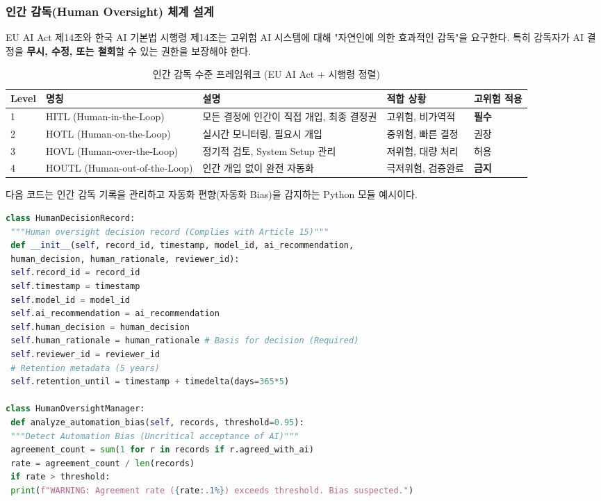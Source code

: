 \subsubsection*{인간 감독(Human Oversight) 체계 설계}
EU AI Act 제14조와 한국 AI 기본법 시행령 제14조는 고위험 AI 시스템에 대해 "자연인에 의한 효과적인 감독"을 요구한다. 특히 감독자가 AI 결정을 \textbf{무시, 수정, 또는 철회}할 수 있는 권한을 보장해야 한다.

\begin{table}[h]
\centering
\caption{인간 감독 수준 프레임워크 (EU AI Act + 시행령 정렬)}
\begin{tabular}{|p{}|p{}|p{}|p{}|p{}|}
\hline
\textbf{Level} & \textbf{명칭} & \textbf{설명} & \textbf{적합 상황} & \textbf{고위험 적용} \\ \hline
1 & HITL (Human-in-the-Loop) & 모든 결정에 인간이 직접 개입, 최종 결정권 & 고위험, 비가역적 & \textbf{필수} \\ \hline
2 & HOTL (Human-on-the-Loop) & 실시간 모니터링, 필요시 개입 & 중위험, 빠른 결정 & 권장 \\ \hline
3 & HOVL (Human-over-the-Loop) & 정기적 검토, System Setup 관리 & 저위험, 대량 처리 & 허용 \\ \hline
4 & HOUTL (Human-out-of-the-Loop) & 인간 개입 없이 완전 자동화 & 극저위험, 검증완료 & \textbf{금지} \\ \hline
\end{tabular}
\end{table}

다음 코드는 인간 감독 기록을 관리하고 자동화 편향(자동화 Bias)을 감지하는 Python 모듈 예시이다.

\begin{lstlisting}[language=Python, caption={Human Oversight Manager}, label={code:human-oversight}]
class HumanDecisionRecord:
 """Human oversight decision record (Complies with Article 15)"""
 def __init__(self, record_id, timestamp, model_id, ai_recommendation, 
 human_decision, human_rationale, reviewer_id):
 self.record_id = record_id
 self.timestamp = timestamp
 self.model_id = model_id
 self.ai_recommendation = ai_recommendation
 self.human_decision = human_decision
 self.human_rationale = human_rationale # Basis for decision (Required)
 self.reviewer_id = reviewer_id
 # Retention metadata (5 years)
 self.retention_until = timestamp + timedelta(days=365*5)

class HumanOversightManager:
 def analyze_automation_bias(self, records, threshold=0.95):
 """Detect Automation Bias (Uncritical acceptance of AI)"""
 agreement_count = sum(1 for r in records if r.agreed_with_ai)
 rate = agreement_count / len(records)
 if rate > threshold:
 print(f"WARNING: Agreement rate ({rate:.1%}) exceeds threshold. Bias suspected.")
\end{lstlisting}

